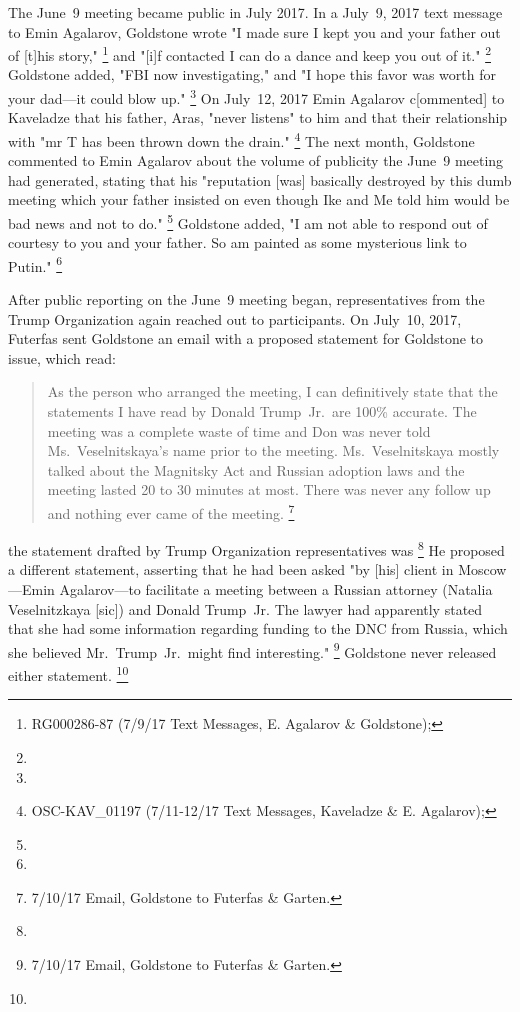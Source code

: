 The June~9 meeting became public in July 2017.
In a July~9, 2017 text message to Emin Agalarov, Goldstone wrote "I made sure I kept you and your father out of [t]his story,"%
\footnote{RG000286-87 (7/9/17 Text Messages, E. Agalarov \& Goldstone); }
and "[i]f contacted I can do a dance and keep you out of it."%
\footnote{}
Goldstone added, "FBI now investigating," and "I hope this favor was worth for your dad---it could blow up."%
\footnote{ }
On July~12, 2017 Emin Agalarov c[ommented] to Kaveladze that his father, Aras, "never listens" to him and that their relationship with "mr T has been thrown down the drain."%
\footnote{OSC-KAV\_01197 (7/11-12/17 Text Messages, Kaveladze \& E. Agalarov); }
The next month, Goldstone commented to Emin Agalarov about the volume of publicity the June~9 meeting had generated, stating that his "reputation [was] basically destroyed by this dumb meeting which your father insisted on even though Ike and Me told him would be bad news and not to do."%
\footnote{}
Goldstone added, "I am not able to respond out of courtesy to you and your father.
So am painted as some mysterious link to Putin."%
\footnote{}

After public reporting on the June~9 meeting began, representatives from the Trump Organization again reached out to participants.
On July~10, 2017, Futerfas sent Goldstone an email with a proposed statement for Goldstone to issue, which read:

\begin{quote}
As the person who arranged the meeting, I can definitively state that the statements I have read by Donald Trump~Jr.\ are 100\% accurate.
The meeting was a complete waste of time and Don was never told Ms.~Veselnitskaya's name prior to the meeting.
Ms.~Veselnitskaya mostly talked about the Magnitsky Act and Russian adoption laws and the meeting lasted 20 to 30 minutes at most.
There was never any follow up and nothing ever came of the meeting.%
\footnote{7/10/17 Email, Goldstone to Futerfas \& Garten.}
\end{quote}

the statement drafted by Trump Organization representatives was
\footnote{}
He proposed a different statement, asserting that he had been asked "by [his] client in Moscow---Emin Agalarov---to facilitate a meeting between a Russian attorney (Natalia Veselnitzkaya [sic]) and Donald Trump~Jr.
The lawyer had apparently stated that she had some information regarding funding to the DNC from Russia, which she believed Mr.~Trump~Jr.\ might find interesting."%
\footnote{7/10/17 Email, Goldstone to Futerfas \& Garten.}
Goldstone never released either statement.%
\footnote{}

